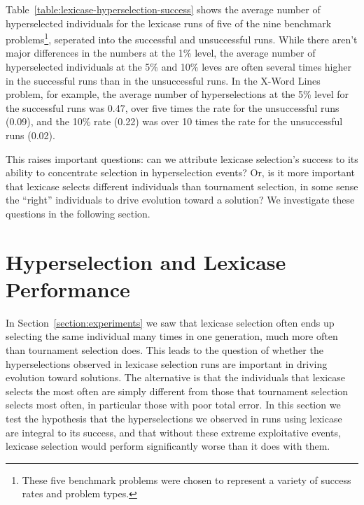 \documentclass{sig-alternate}
\begin{document}
Table~\ref{table:lexicase-hyperselection-success} shows the average number of hyperselected individuals for the lexicase runs of five of the nine benchmark problems\footnote{These five benchmark problems were chosen %
to represent a variety of success rates and problem types.}, seperated into the successful and unsuccessful runs. While there aren't major differences in the numbers at the 1\% level, the average number of hyperselected individuals at the 5\% and 10\% leves are often several times higher in the successful runs than in the unsuccessful runs. In the X-Word Lines problem, for example, the average number of hyperselections at the 5\% level for the successful runs was 0.47, over five times the rate for the unsuccessful runs (0.09), and the 10\% rate (0.22) was over 10 times the rate for the unsuccessful runs (0.02).

This raises important questions: can we attribute lexicase selection's success to its ability to concentrate selection in hyperselection events? Or, is it more important that lexicase selects different individuals than tournament selection, in some sense the ``right'' individuals to drive evolution toward a solution? We investigate these questions in the following section.

\section{Hyperselection and Lexicase\\Performance}
\label{section:HyperSelectionandLexicasePerformance}

In Section~\ref{section:experiments} we saw that lexicase selection often ends up selecting the same individual many times in one generation, much more often than tournament selection does. This leads to the question of whether the hyperselections observed in lexicase selection runs are important in driving evolution toward solutions. %
The alternative is that the individuals that lexicase selects the most often are simply different from those that tournament selection selects most often, in particular those with poor total error. In this section we test the hypothesis that the hyperselections we observed in runs using lexicase are integral to its success, and that without these extreme exploitative events, lexicase selection would perform significantly worse than it does with them.
\end{document}
